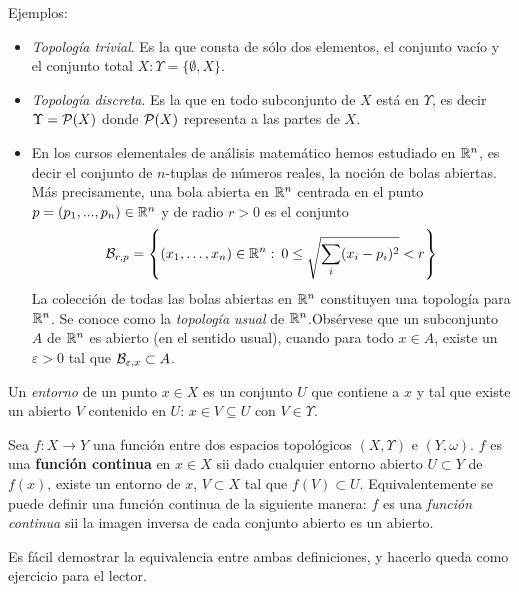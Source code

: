 Ejemplos:
%
\begin{itemize}
\item {\it  Topolog\'ia trivial}. Es la  que consta de s\'olo  dos elementos, el
  conjunto vac\'io y el conjunto total $X: \Upsilon = \{ \emptyset , X \}$.
%
\item {\it Topolog\'ia discreta}. Es la que en todo subconjunto de $X$ est\'a en
  $\Upsilon$, es decir $\Upsilon =  \P(X)$ donde $\P(X)$ representa a las partes
  de $X$.
%
\item En  los cursos elementales  de an\'alisis matem\'atico hemos  estudiado en
  $\Rset^n$, es decir el conjunto de $n$-tuplas de n\'umeros reales, la noci\'on
  de bolas abiertas. M\'as precisamente,  una bola abierta en $\Rset^n$ centrada
  en el punto $p = (p_1,...,p_n) \in \Rset^n$ y de radio $r > 0$ es el conjunto
  \[
  \B_{r,p} = \left\{ (x_1 , \ldots , x_n) \in \Rset^n:   \: 0 \le   \sqrt{\sum_i
      (x_i-p_i)^2} < r \right\}
  \]
  La  colecci\'on de  todas  las  bolas abiertas  en  $\Rset^n$ constituyen  una
  topolog\'ia  para $\Rset^n$.   Se conoce  como la  {\it topolog\'ia  usual} de
  $\Rset^n$.\newline Obs\'ervese que un  subconjunto $A$ de $\Rset^n$ es abierto
  (en el sentido  usual), cuando para todo  $x \in A$, existe un  $\varepsilon > 0$
  tal que $\B_{\varepsilon,x} \subset A$.
\end{itemize}

\begin{definicion}[Entorno]
  Un {\it entorno} de un punto $x \in X$ es un conjunto $U$ que contiene a $x$ y
  tal que existe un  abierto $V$ contenido en $U$: $x \in  V \subseteq U$ con $V
  \in \Upsilon$.
\end{definicion}

\begin{definicion}
  Sea $f: X  \rightarrow Y$ una funci\'on entre  dos espacios topol\'ogicos $(X,
  \Upsilon)$ e  $(Y,\omega)$. $f$ es una  {\bf funci\'on continua} en  $x \in X$
  sii dado cualquier entorno abierto $U  \subset Y$ de $f(x)$, existe un entorno
  de $x$,  $V \subset  X$ tal  que $f(V) \subset  U$. Equivalentemente  se puede
  definir  una  funci\'on continua  de  la siguiente  manera:  $f$  es una  {\it
    funci\'on continua}  sii la  imagen inversa de  cada conjunto abierto  es un
  abierto.
\end{definicion}
%
%
Es f\'acil demostrar la equivalencia entre ambas definiciones, y hacerlo queda como ejercicio para el lector.

